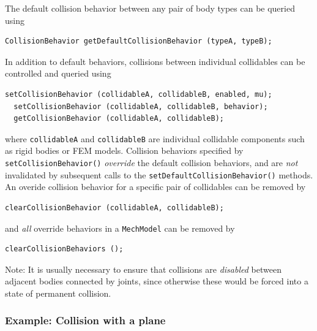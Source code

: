 The default collision behavior between any pair of body types can
be queried using
%
\begin{lstlisting}[]
  CollisionBehavior getDefaultCollisionBehavior (typeA, typeB);
\end{lstlisting}
%

In addition to default behaviors, collisions between individual
collidables can be controlled and queried using
%
\begin{lstlisting}[]
  setCollisionBehavior (collidableA, collidableB, enabled, mu);
  setCollisionBehavior (collidableA, collidableB, behavior);
  getCollisionBehavior (collidableA, collidableB);
\end{lstlisting}
%
where {\tt collidableA} and {\tt collidableB} are individual
collidable components such as rigid bodies or FEM models.  Collision
behaviors specified by {\tt setCollisionBehavior()} {\it override} the
default collision behaviors, and are {\it not} invalidated by
subsequent calls to the {\tt setDefaultCollisionBehavior()} methods.
An overide collision behavior for a specific pair of collidables
can be removed by
%
\begin{lstlisting}[]
  clearCollisionBehavior (collidableA, collidableB);
\end{lstlisting}
%
and {\it all} override behaviors in a {\tt MechModel} can
be removed by 
%
\begin{lstlisting}[]
  clearCollisionBehaviors ();
\end{lstlisting}
%

\begin{sideblock}
Note: It is usually necessary to ensure that collisions are {\it disabled}
between adjacent bodies connected by joints, since otherwise these
would be forced into a state of permanent collision.
\end{sideblock}

\subsubsection{Example: Collision with a plane}

